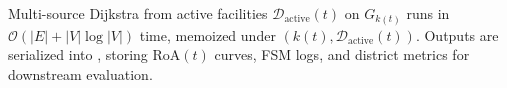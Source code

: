 \noindent
Multi-source Dijkstra from active facilities $\mathcal{D}_{\text{active}}(t)$ on $G_{k(t)}$ runs in $\mathcal{O}(|E| + |V|\log |V|)$ time, memoized under $(k(t), \mathcal{D}_{\text{active}}(t))$.
Outputs are serialized into , storing $\text{RoA}(t)$ curves, FSM logs, and district metrics for downstream evaluation.
